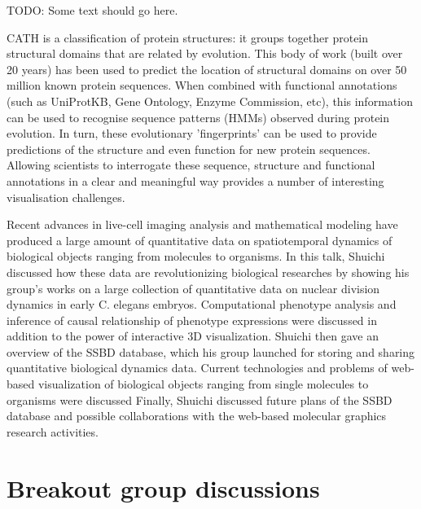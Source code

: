 \documentclass[a4paper]{article}
\begin{document}

TODO: Some text should go here.



CATH is a classification of protein structures: it groups together protein structural domains that are related by evolution. This body of work (built over 20 years) has been used to predict the location of structural domains on over 50 million known protein sequences. When combined with functional annotations (such as UniProtKB, Gene Ontology, Enzyme Commission, etc), this information can be used to recognise sequence patterns (HMMs) observed during protein evolution. In turn, these evolutionary 'fingerprints' can be used to provide predictions of the structure and even function for new protein sequences. Allowing scientists to interrogate these sequence, structure and functional annotations in a clear and meaningful way provides a number of interesting visualisation challenges.



Recent advances in live-cell imaging analysis and mathematical modeling have produced a large amount of quantitative data on spatiotemporal dynamics of biological objects ranging from molecules to organisms. In this talk, Shuichi discussed how these data are revolutionizing biological researches by showing his group's works on a large collection of quantitative data on nuclear division dynamics in early C. elegans embryos. Computational phenotype analysis and inference of causal relationship of phenotype expressions were discussed in addition to the power of interactive 3D visualization. Shuichi then gave an overview of the SSBD database, which his group launched for storing and sharing quantitative biological dynamics data. Current technologies and problems of web-based visualization of biological objects ranging from single molecules to organisms were discussed Finally, Shuichi discussed future plans of the SSBD database and possible collaborations with the web-based molecular graphics research activities.




\section{Breakout group discussions}
\end{document}
